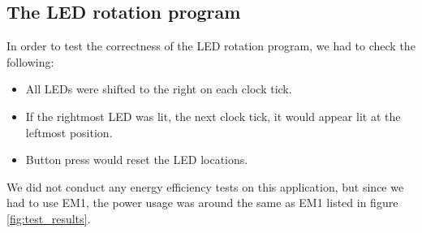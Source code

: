 	\subsection{The LED rotation program}
	In order to test the correctness of the LED rotation program, we had to check the following:
	\begin{itemize}
		\item All LEDs were shifted to the right on each clock tick.
		\item If the rightmost LED was lit, the next clock tick, it would appear lit at the leftmost position.
		\item Button press would reset the LED locations.
	\end{itemize}
	We did not conduct any energy efficiency tests on this application, but since we had to use EM1, the power usage was around the same as EM1 listed in figure \ref{fig:test_results}.

